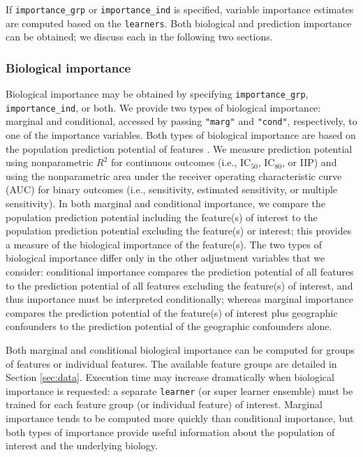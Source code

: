 \documentclass[]{article}
\begin{document}
If \texttt{importance\_grp} or \texttt{importance\_ind} is specified,
variable importance estimates are computed based on the
\texttt{learners}. Both biological and prediction importance can be
obtained; we discuss each in the following two sections.

\subsubsection{Biological importance}\label{sec:biolimp}

Biological importance may be obtained by specifying
\texttt{importance\_grp}, \texttt{importance\_ind}, or both. We provide
two types of biological importance: marginal and conditional, accessed
by passing \texttt{"marg"} and \texttt{"cond"}, respectively, to one of
the importance variables. Both types of biological importance are based
on the population prediction potential of features
\citep{williamson2020}. We measure prediction potential using
nonparametric \(R^2\) for continuous outcomes (i.e., IC\(_{50}\),
IC\(_{80}\), or IIP) and using the nonparametric area under the receiver
operating characteristic curve (AUC) for binary outcomes (i.e.,
sensitivity, estimated sensitivity, or multiple sensitivity). In both
marginal and conditional importance, we compare the population
prediction potential including the feature(s) of interest to the
population prediction potential excluding the feature(s) or interest;
this provides a measure of the biological importance of the feature(s).
The two types of biological importance differ only in the other
adjustment variables that we consider: conditional importance compares
the prediction potential of all features to the prediction potential of
all features excluding the feature(s) of interest, and thus importance
must be interpreted conditionally; whereas marginal importance compares
the prediction potential of the feature(s) of interest plus geographic
confounders to the prediction potential of the geographic confounders
alone.

Both marginal and conditional biological importance can be computed for
groups of features or individual features. The available feature groups
are detailed in Section \ref{sec:data}. Execution time may increase
dramatically when biological importance is requested: a separate
\texttt{learner} (or super learner ensemble) must be trained for each
feature group (or individual feature) of interest. Marginal importance
tends to be computed more quickly than conditional importance, but both
types of importance provide useful information about the population of
interest and the underlying biology.
\end{document}
